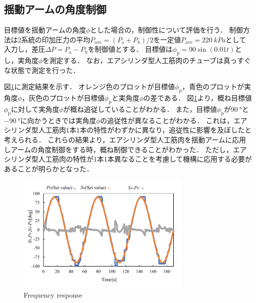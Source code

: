\subsection{揺動アームの角度制御}
目標値を揺動アームの角度$\phi$とした場合の，制御性について評価を行う．
制御方法は2系統の印加圧力の平均$P_\mathrm{ave}=(P_\mathrm{a} + P_\mathrm{b})/2$を一定値$P_\mathrm{ave}=\SI{220}{kPa}$として入力し，差圧$\Delta P = P_\mathrm{a} - P_\mathrm{b}$を制御値とする．
目標値は$\phi_\mathrm{p} = 90 \sin(0.01t)$とし，実角度$\phi$を測定する．
なお，エアシリンダ型人工筋肉のチューブは真っすぐな状態で測定を行った．
\par
図\ref{Frequency response}に測定結果を示す．
オレンジ色のプロットが目標値$\phi_\mathrm{p}$，青色のプロットが実角度$\phi$，灰色のプロットが目標値$\phi_\mathrm{p}$と実角度$\phi$の差である．
図\ref{Frequency response}より，概ね目標値$\phi_\mathrm{p}$に対して実角度$\phi$が概ね追従していることがわかる．
また，目標値$\phi_\mathrm{p}$が$\SI{90}{\degree}$と$\SI{-90}{\degree}$に向かうときでは実角度$\phi$の追従性が異なることがわかる．
これは，エアシリンダ型人工筋肉1本1本の特性がわずかに異なり，追従性に影響を及ぼしたと考えられる．
これらの結果より，エアシリンダ型人工筋肉を揺動アームに応用しアームの角度制御をする時，概ね制御できることがわかった．
ただし，エアシリンダ型人工筋肉の特性が1本1本異なることを考慮して機構に応用する必要があることが明らかとなった．
\begin{figure}[t]
  \centering
  \includegraphics[width=85mm]{_pdf/result_frequency_response.pdf}
  \caption{Frequency response}
  \label{Frequency response}
\end{figure}

